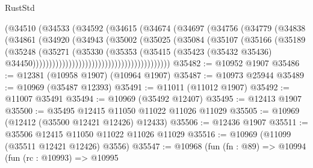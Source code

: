 \begin{lexlean}{RustStd}
\begin{coremodule}
                                        (@34510
                                          (@34533
                                            (@34592
                                              (@34615
                                                (@34674
                                                  (@34697
                                                    (@34756
                                                      (@34779
                                                        (@34838
                                                          (@34861
                                                            (@34920
                                                              (@34943
                                                                (@35002
                                                                  (@35025
                                                                    (@35084
                                                                      (@35107
                                                                        (@35166
                                                                          (@35189
                                                                            (@35248
                                                                              (@35271
                                                                                (@35330
                                                                                  (@35353
                                                                                    (@35415
                                                                                      (@35423
                                                                                        (@35432
                                                                                          @35436)
                                                                                        @34450))))))))))))))))))))))))))))))))))))))))))
@35482 := @10952 @1907
@35486 := @12381 (@10958 @1907) (@10964 @1907)
@35487 := @10973 @25944
@35489 := @10969 (@35487 @12393)
@35491 := @11011 (@11012 @1907)
@35492 := @11007 @35491
@35494 := @10969 (@35492 @12407)
@35495 := @12413 @1907
@35500 := @35495 @12415 @11050 @11022 @11026 @11029
@35505 := @10969 (@12412 (@35500 @12421 @12426) @12433)
@35506 := @12436 @1907
@35511 := @35506 @12415 @11050 @11022 @11026 @11029
@35516 := @10969 (@11099 (@35511 @12421 @12426) @3556)
@35547 := @10968
    (fun (fn : @89) =>
    @10994
      (fun (rc : @10993) =>
      @10995

\end{coremodule}
\end{lexlean}
